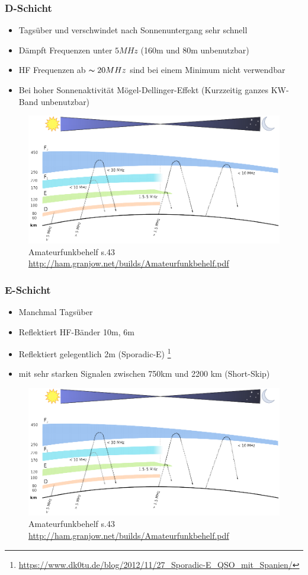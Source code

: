 \begin{frame}
  \frametitle{D-Schicht}
  \begin{itemize}
    \item Tagsüber und verschwindet nach Sonnenuntergang sehr schnell
    \item Dämpft Frequenzen unter $5MHz$ (160m und 80m unbenutzbar)
    \item HF Frequenzen ab $\thicksim20MHz$ sind bei einem Minimum nicht verwendbar
    \item Bei hoher Sonnenaktivität Mögel-Dellinger-Effekt (Kurzzeitig ganzes KW-Band unbenutzbar)
  \end{itemize}
  \begin{center}
    \begin{figure}
      \includegraphics[width=.6\textwidth,height=.4\textheight,keepaspectratio]{e09/schichten_behelf_43.png}
      \caption{Amateurfunkbehelf s.43 \ExternalLink \url{http://ham.granjow.net/builds/Amateurfunkbehelf.pdf}}
    \end{figure}
  \end{center}
\end{frame}

\begin{frame}
  \frametitle{E-Schicht}
  \begin{itemize}
    \item Manchmal Tagsüber
    \item Reflektiert HF-Bänder 10m, 6m
    \item Reflektiert gelegentlich 2m (Sporadic-E) \footnote{\tiny \url{https://www.dk0tu.de/blog/2012/11/27_Sporadic-E_QSO_mit_Spanien/}}
    \item mit sehr starken Signalen zwischen 750km und 2200 km (Short-Skip)
  \end{itemize}
  \begin{center}
    \begin{figure}
      \includegraphics[width=.8\textwidth,height=.4\textheight,keepaspectratio]{e09/schichten_behelf_43.png}
      \caption{Amateurfunkbehelf s.43 \ExternalLink \url{http://ham.granjow.net/builds/Amateurfunkbehelf.pdf}}
    \end{figure}
  \end{center}
\end{frame}

